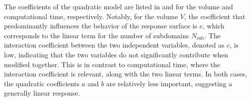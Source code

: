 The coefficients of the quadratic model are listed in  and  for the volume and computational time, respectively. Notably, for the volume $V$, the coefficient that predominantly influences the behavior of the response surface is $e$, which corresponds to the linear term for the number of subdomains $N_\text{sub}$. The interaction coefficient between the two independent variables, denoted as $c$, is low, indicating that the two variables do not significantly contribute when modified together. This is in contrast to computational time, where the interaction coefficient is relevant, along with the two linear terms. In both cases, the quadratic coefficients $a$ and $b$ are relatively less important, suggesting a generally linear response.

\begin{figure}
    \hspace*{\fill}
    \hfill
    \hspace*{\fill}
    \bigskip
    \hspace*{\fill}

\end{figure}
